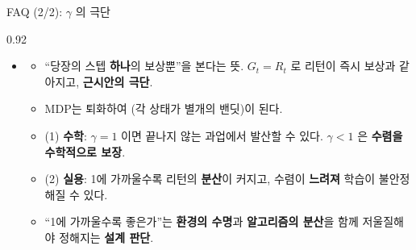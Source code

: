 \begin{frame}{FAQ (2/2): $\gamma$ 의 극단}
\begin{center}\begin{varwidth}{0.92\textwidth}
  \begin{itemize}
    
      \item[] \begin{itemize}
        \item ``당장의 스텝 \textbf{하나}의 보상뿐''을 본다는 뜻.
          $G_t = R_t$ 로 리턴이 즉시 보상과 같아지고,
          \textbf{근시안의 극단}.
        \item MDP는 퇴화하여 (각 상태가 별개의
          밴딧)이 된다.
        
      \end{itemize}
    
      \begin{itemize}
        \item (1) \textbf{수학}: $\gamma = 1$ 이면 끝나지 않는
          과업에서 발산할 수 있다. $\gamma < 1$ 은 \textbf{수렴을
          수학적으로 보장}.
        \item (2) \textbf{실용}: 1에 가까울수록 리턴의
          \textbf{분산}이 커지고, 수렴이 \textbf{느려져} 학습이
          불안정해질 수 있다.
        \item ``1에 가까울수록 좋은가''는 \textbf{환경의 수명}과
          \textbf{알고리즘의 분산}을 함께 저울질해야 정해지는
          \textbf{설계 판단}.
      \end{itemize}
  \end{itemize}
\end{varwidth}\end{center}
\end{frame}
